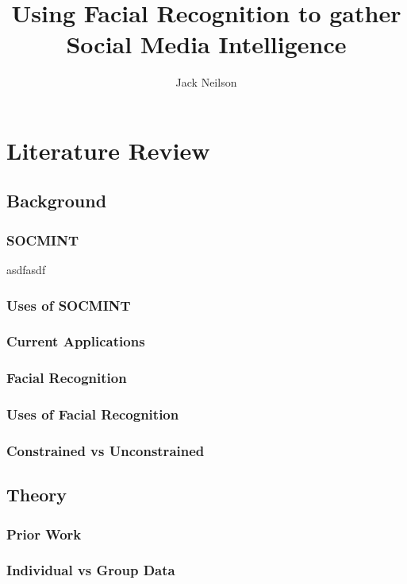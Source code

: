 \documentclass{article}
\begin{document}
\title{Using Facial Recognition to gather Social Media Intelligence}
\author{Jack Neilson}
\maketitle
\newpage
{}
\section{Literature Review}
\subsection{Background}
\todo{}

\subsubsection{SOCMINT}
asdfasdf \citep{criminalvshumint}

\subsubsection{Uses of SOCMINT}

\subsubsection{Current Applications}

\subsubsection{Facial Recognition}

\subsubsection{Uses of Facial Recognition}

\subsubsection{Constrained vs Unconstrained}

\subsection{Theory}
\subsubsection{Prior Work}

\subsubsection{Individual vs Group Data}
\end{document}
